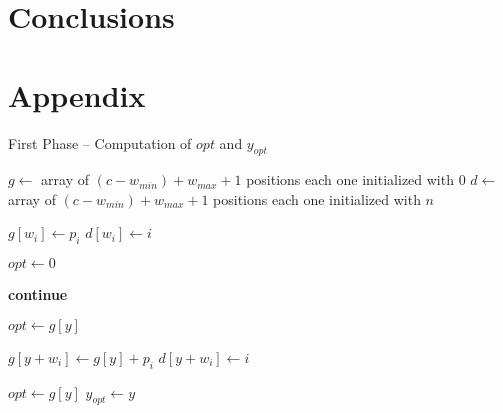 \documentclass[runningheads,a4paper]{llncs}
\begin{document}
\section{Conclusions}

\section{Appendix}
\begin{centering}
\begin{algorithm}
\caption{First Phase -- Computation of $opt$ and $y_{opt}$}\label{alg:ukp5}
\begin{algorithmic}[1]
  \State \(g \gets\) array of \((c - w_{min}) + w_{max} + 1\) positions each one initialized with \(0\)\label{create_g}
  \State \(d \gets\) array of \((c - w_{min}) + w_{max} + 1\) positions each one initialized with \(n\)\label{create_d}
  
  \label{begin_trivial_bounds}
      \State \(g[w_i] \gets p_i\)
      \State \(d[w_i] \gets i\)
    \EndIf
  \EndFor\label{end_trivial_bounds}

  \State \(opt \gets 0\)\label{init_opt}

  \label{main_ext_loop_begin}
    \label{if_less_than_opt_begin}
    	\State \textbf{continue}\label{alg:continue}
    \EndIf\label{if_less_than_opt_end}
    
    \State \(opt \gets g[y]\)\label{update_opt}
    
    \label{main_inner_loop_begin}
      \label{if_new_lower_bound_begin}
        \State \(g[y + w_i] \gets g[y] + p_i\)
        \State \(d[y + w_i] \gets i\)
      \EndIf\label{if_new_lower_bound_end}
    \EndFor\label{main_inner_loop_end}
  \EndFor\label{main_ext_loop_end}

  \label{get_y_opt_loop_begin}
    \label{last_loop_inner_if}
      \State \(opt \gets g[y]\)
      \State \(y_{opt} \gets y\)
    \EndIf
  \EndFor\label{get_y_opt_loop_end}
\EndProcedure
\end{algorithmic}
\end{algorithm}
\end{centering}
\end{document}

